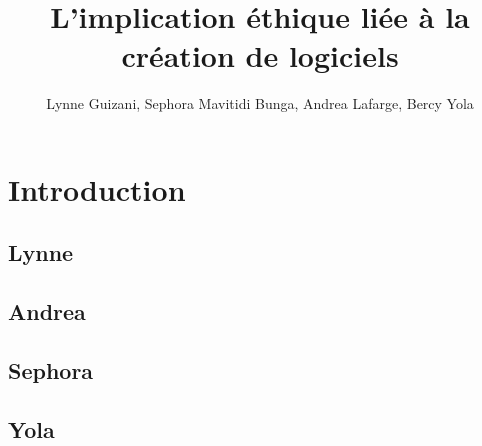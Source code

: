 \documentclass{article}
\title{L'implication éthique liée à la création de logiciels}
\author{Lynne Guizani, Sephora Mavitidi Bunga, Andrea Lafarge, Bercy Yola}
\begin{document}
\maketitle

\section{Introduction}

\subsection{Lynne}

\subsection{Andrea}


\subsection{Sephora}


\subsection{Yola}
\end{document}
